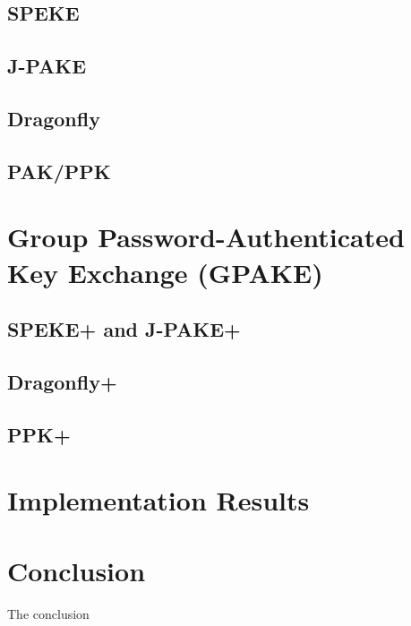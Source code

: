 \documentclass{amsart}
\theoremstyle{remark}
\begin{document}
\subsection{SPEKE}
\label{sec:SPEKE}

\vspace{0.3in}

\subsection{J-PAKE} 
\label{sec:JPAKE}

\vspace{0.3in}

\subsection{Dragonfly}
\label{sec:Dragon}

\vspace{0.3in}

\subsection{PAK/PPK}
\label{sec:PPK}



\section{Group Password-Authenticated Key Exchange (GPAKE)} 
\label{sec:GPAKE}


\subsection{SPEKE+ and J-PAKE+}


\subsection{Dragonfly+}


\subsection{PPK+}



\section{Implementation Results}
\label{sec:Implementation}



\section{Conclusion}
\label{sec:Conclusion}
The conclusion




\nocite{*}


\end{document}
